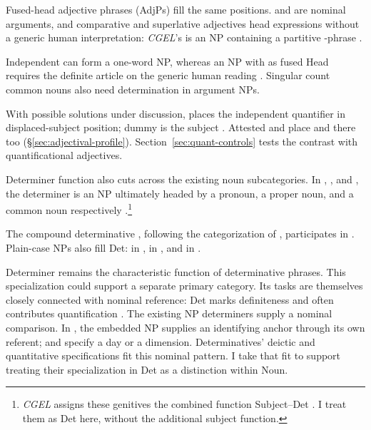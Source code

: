 \documentclass[12pt]{article}
\begin{document}
Fused-head adjective phrases (AdjPs) fill the same positions.  and  are nominal arguments, and comparative and superlative adjectives head expressions without a generic human interpretation: \textit{CGEL}'s  is an NP containing a partitive -phrase \citep[332--333, 416--423]{huddleston2002}.

Independent  can form a one-word NP, whereas an NP with  as fused Head requires the definite article  on the generic human reading \citep[417--418]{huddleston2002}. Singular count common nouns also need determination in argument NPs.

With possible solutions under discussion,  places the independent quantifier in displaced-subject position; dummy  is the subject \citep[1391--1393]{huddleston2002}. Attested  and  place  and  there too (§\ref{sec:adjectival-profile}). Section~\ref{sec:quant-controls} tests the contrast with quantificational adjectives.

Determiner function also cuts across the existing noun subcategories. In , , and , the determiner is an NP ultimately headed by a pronoun, a proper noun, and a common noun respectively \citep[354--355, 470--471]{huddleston2002}.\footnote{\textit{CGEL} assigns these genitives the combined function Subject--Det \citep[472--473]{huddleston2002}. I treat them as Det here, without the additional subject function.}

The compound determinative , following the categorization of \textcite[§1.3]{Payne2007}, participates in . Plain-case NPs also fill Det:  in ,  in , and  in  \citep[356]{huddleston2002}.

Determiner remains the characteristic function of determinative phrases. This specialization could support a separate primary category. Its tasks are themselves closely connected with nominal reference: Det marks definiteness and often contributes quantification \citep[354--359]{huddleston2002}. The existing NP determiners supply a nominal comparison. In , the embedded NP supplies an identifying anchor through its own referent;  and  specify a day or a dimension. Determinatives' deictic and quantitative specifications fit this nominal pattern. I take that fit to support treating their specialization in Det as a distinction within Noun.
\end{document}
